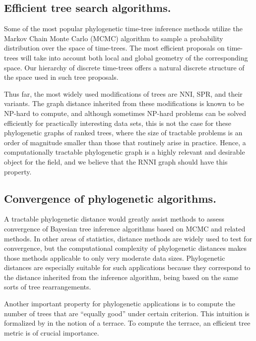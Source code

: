 \documentclass[11pt]{amsart}
\theoremstyle{definition}
\newcommand{\nni}{\mathrm{NNI}}
\newcommand{\rnni}{\mathrm{RNNI}}
\providecommand{\DIFdelbegin}{} %
\begin{document}
\subsection{Efficient tree search algorithms.}

Some of the most popular phylogenetic time-tree inference methods utilize the Markov Chain Monte Carlo (MCMC) algorithm to sample a probability distribution over the space of time-trees.
The most efficient proposals on time-trees will take into account both local and global geometry of the corresponding space.
Our hierarchy of discrete time-trees offers a natural discrete structure of the space used in such tree proposals.

Thus far, the most widely used modifications of trees are $\nni$, SPR, and their variants.
The graph distance inherited from these modifications is known to be NP-hard to compute, and although sometimes NP-hard problems can be solved efficiently for practically interesting data sets, this is not the case for these phylogenetic graphs of ranked trees, where the size of tractable problems is an order of magnitude smaller than those that routinely arise in practice.
Hence, a computationally tractable phylogenetic graph is a highly relevant and desirable object for the field, and we believe that the $\rnni$ graph should have this property.


\subsection{Convergence of phylogenetic algorithms.}

A tractable phylogenetic distance would greatly assist methods to assess convergence of Bayesian tree inference algorithms based on MCMC and related methods.
In other areas of statistics, distance methods are widely used to test for convergence, but the computational complexity of phylogenetic distances makes those methods applicable to only very moderate data sizes.
Phylogenetic distances are especially suitable for such applications because they correspond to the distance inherited from the inference algorithm, being based on the same sorts of tree rearrangements.

Another important property for phylogenetic applications is to compute the number of trees that are ``equally good'' under certain criterion.
This intuition is formalized by \textcite{Sanderson2011-zp} in the notion of a terrace.
To compute the terrace, an efficient tree metric is of crucial importance.
\DIFdelbegin %
\end{document}
